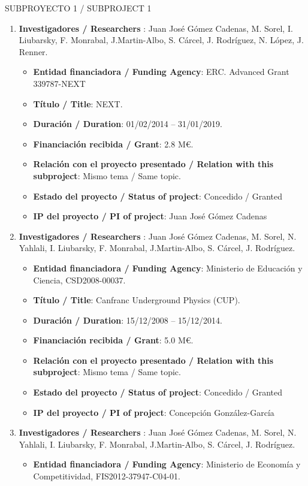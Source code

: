 {\sc SUBPROYECTO 1 / SUBPROJECT 1}

\begin{enumerate}
\item {\bf Investigadores / Researchers }: Juan José Gómez Cadenas, M. Sorel, I. Liubarsky, F. Monrabal, J.Martin-Albo, S. Cárcel, J. Rodríguez, N. López, J. Renner.
\begin{itemize}
\item {\bf Entidad financiadora / Funding Agency}: ERC. Advanced Grant 339787-NEXT 
\item {\bf Título / Title}:  NEXT.
\item {\bf Duración / Duration}: 01/02/2014 -- 31/01/2019. 
\item {\bf Financiación recibida / Grant}: 2.8 M\euro. 
\item {\bf Relación con el proyecto presentado / Relation with this subproject}: Mismo tema / Same topic. 
\item {\bf Estado del proyecto / Status of project}: Concedido / Granted
\item {\bf IP del proyecto / PI of project}: Juan José Gómez Cadenas
\end{itemize}
\item {\bf Investigadores / Researchers }: Juan José Gómez Cadenas, M. Sorel, N. Yahlali, I. Liubarsky, F. Monrabal, J.Martin-Albo, S. Cárcel, J. Rodríguez.
\begin{itemize}
\item {\bf Entidad financiadora / Funding Agency}: Ministerio de Educaci\'on y Ciencia, CSD2008-00037.
\item {\bf Título / Title}:  Canfranc Underground Physics (CUP).
\item {\bf Duración / Duration}: 15/12/2008 -- 15/12/2014. 
\item {\bf Financiación recibida / Grant}: 5.0 M\euro. 
\item {\bf Relación con el proyecto presentado / Relation with this subproject}: Mismo tema / Same topic. 
\item {\bf Estado del proyecto / Status of project}: Concedido / Granted
\item {\bf IP del proyecto / PI of project}: Concepción González-García 
\end{itemize}
\item {\bf Investigadores / Researchers }: Juan José Gómez Cadenas, M. Sorel, N. Yahlali, I. Liubarsky, F. Monrabal, J.Martin-Albo, S. Cárcel, J. Rodríguez.
\begin{itemize}
\item {\bf Entidad financiadora / Funding Agency}:  Ministerio de Econom\'ia y Competitividad, FIS2012-37947-C04-01.

\end{itemize}
\end{enumerate}
